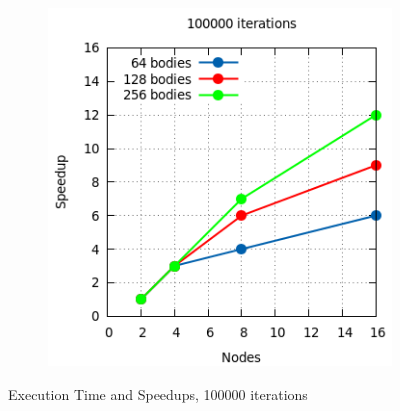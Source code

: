 \documentclass[a4paper]{article}
\begin{document}
\begin{figure}[ht]
\begin{subfigure}{.5\textwidth}
\end{subfigure} %
\begin{subfigure}{.4\textwidth}
  \centering
  \includegraphics[width=1\linewidth]{results/100000_sp}
\end{subfigure}
  \caption{Execution Time and Speedups, 100000 iterations}
  \label{fig:R1}
\end{figure}
\FloatBarrier

\enspace
\end{document}
